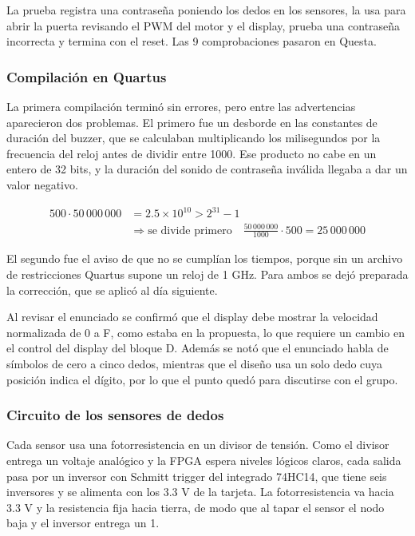 \documentclass[11pt,letterpaper]{article}
\begin{document}
La prueba registra una contraseña poniendo los dedos en los sensores, la usa para abrir la puerta revisando el PWM del motor y el display, prueba una contraseña incorrecta y termina con el reset. Las 9 comprobaciones pasaron en Questa.

\subsubsection*{Compilación en Quartus}

La primera compilación terminó sin errores, pero entre las advertencias aparecieron dos problemas. El primero fue un desborde en las constantes de duración del buzzer, que se calculaban multiplicando los milisegundos por la frecuencia del reloj antes de dividir entre 1000. Ese producto no cabe en un entero de 32 bits, y la duración del sonido de contraseña inválida llegaba a dar un valor negativo.

\begin{align*}
500 \cdot 50\,000\,000 &= 2.5 \times 10^{10} > 2^{31} - 1 \\
&\Rightarrow \text{se divide primero}\quad \frac{50\,000\,000}{1000} \cdot 500 = 25\,000\,000
\end{align*}

El segundo fue el aviso de que no se cumplían los tiempos, porque sin un archivo de restricciones Quartus supone un reloj de 1 GHz. Para ambos se dejó preparada la corrección, que se aplicó al día siguiente.

Al revisar el enunciado se confirmó que el display debe mostrar la velocidad normalizada de 0 a F, como estaba en la propuesta, lo que requiere un cambio en el control del display del bloque D. Además se notó que el enunciado habla de símbolos de cero a cinco dedos, mientras que el diseño usa un solo dedo cuya posición indica el dígito, por lo que el punto quedó para discutirse con el grupo.

\subsubsection*{Circuito de los sensores de dedos}

Cada sensor usa una fotorresistencia en un divisor de tensión. Como el divisor entrega un voltaje analógico y la FPGA espera niveles lógicos claros, cada salida pasa por un inversor con Schmitt trigger del integrado 74HC14, que tiene seis inversores y se alimenta con los 3.3 V de la tarjeta. La fotorresistencia va hacia 3.3 V y la resistencia fija hacia tierra, de modo que al tapar el sensor el nodo baja y el inversor entrega un 1.
\end{document}

